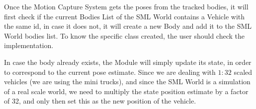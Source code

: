 Once the Motion Capture System gets the poses from the tracked bodies, it will first check if the current Bodies List of the SML World contains a Vehicle with the same id, in case it does not, it will create a new Body and add it to the SML World bodies list. To know the specific class created, the user should check the implementation.

In case the body already exists, the Module will simply update its state, in order to correspond to the current pose estimate. Since we are dealing with $1:32$ scaled vehicles (we are using the mini trucks), and since the SML World is a simulation of a real scale world, we need to multiply the state position estimate by a factor of 32, and only then set this as the new position of the vehicle.